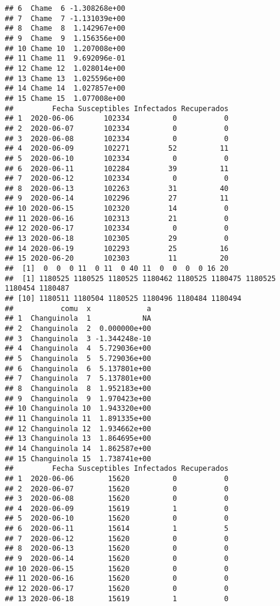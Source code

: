 \documentclass[
]{article}
\begin{document}
\begin{verbatim}
## 6  Chame  6 -1.308268e+00
## 7  Chame  7 -1.131039e+00
## 8  Chame  8  1.142967e+00
## 9  Chame  9  1.156356e+00
## 10 Chame 10  1.207008e+00
## 11 Chame 11  9.692096e-01
## 12 Chame 12  1.028014e+00
## 13 Chame 13  1.025596e+00
## 14 Chame 14  1.027857e+00
## 15 Chame 15  1.077008e+00
##         Fecha Susceptibles Infectados Recuperados
## 1  2020-06-06       102334          0           0
## 2  2020-06-07       102334          0           0
## 3  2020-06-08       102334          0           0
## 4  2020-06-09       102271         52          11
## 5  2020-06-10       102334          0           0
## 6  2020-06-11       102284         39          11
## 7  2020-06-12       102334          0           0
## 8  2020-06-13       102263         31          40
## 9  2020-06-14       102296         27          11
## 10 2020-06-15       102320         14           0
## 11 2020-06-16       102313         21           0
## 12 2020-06-17       102334          0           0
## 13 2020-06-18       102305         29           0
## 14 2020-06-19       102293         25          16
## 15 2020-06-20       102303         11          20
##  [1]  0  0  0 11  0 11  0 40 11  0  0  0  0 16 20
##  [1] 1180525 1180525 1180525 1180462 1180525 1180475 1180525 1180454 1180487
## [10] 1180511 1180504 1180525 1180496 1180484 1180494
##           comu  x             a
## 1  Changuinola  1            NA
## 2  Changuinola  2  0.000000e+00
## 3  Changuinola  3 -1.344248e-10
## 4  Changuinola  4  5.729036e+00
## 5  Changuinola  5  5.729036e+00
## 6  Changuinola  6  5.137801e+00
## 7  Changuinola  7  5.137801e+00
## 8  Changuinola  8  1.952183e+00
## 9  Changuinola  9  1.970423e+00
## 10 Changuinola 10  1.943320e+00
## 11 Changuinola 11  1.891335e+00
## 12 Changuinola 12  1.934662e+00
## 13 Changuinola 13  1.864695e+00
## 14 Changuinola 14  1.862587e+00
## 15 Changuinola 15  1.738741e+00
##         Fecha Susceptibles Infectados Recuperados
## 1  2020-06-06        15620          0           0
## 2  2020-06-07        15620          0           0
## 3  2020-06-08        15620          0           0
## 4  2020-06-09        15619          1           0
## 5  2020-06-10        15620          0           0
## 6  2020-06-11        15614          1           5
## 7  2020-06-12        15620          0           0
## 8  2020-06-13        15620          0           0
## 9  2020-06-14        15620          0           0
## 10 2020-06-15        15620          0           0
## 11 2020-06-16        15620          0           0
## 12 2020-06-17        15620          0           0
## 13 2020-06-18        15619          1           0

\end{verbatim}
\end{document}

